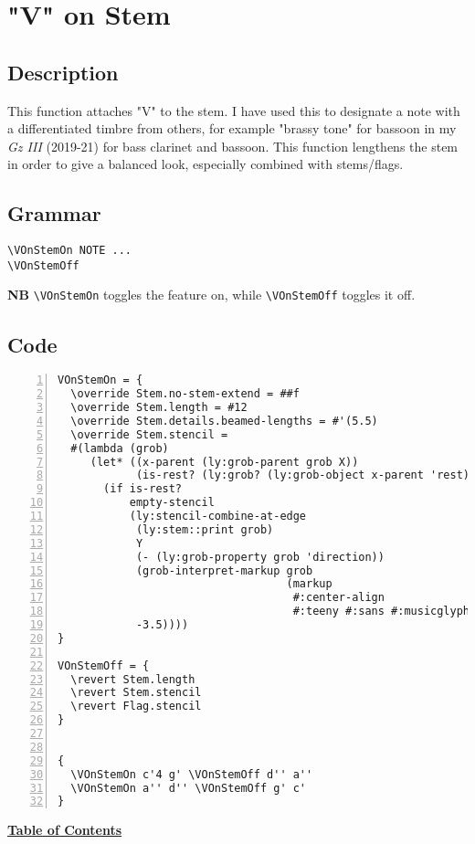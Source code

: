 \vfill \break




\section {"V" on Stem}
\hfill

\subsection{Description}
This function attaches "V" to the stem. I have used this to designate a note with a differentiated timbre from others, for example "brassy tone" for bassoon in my \textit{Gz III} (2019-21) for bass clarinet and bassoon. This function lengthens the stem in order to give a balanced look, especially combined with stems/flags. 
\subsection{Grammar}
\begin{verbatim}
\VOnStemOn NOTE ...
\VOnStemOff
\end{verbatim}
\textbf{NB} \verb|\VOnStemOn| toggles the feature on, while \verb|\VOnStemOff| toggles it off.

\subsection{Code}
\begin{Verbatim}[numbers=left,xleftmargin=5mm]
VOnStemOn = {
  \override Stem.no-stem-extend = ##f
  \override Stem.length = #12
  \override Stem.details.beamed-lengths = #'(5.5)
  \override Stem.stencil =
  #(lambda (grob)
     (let* ((x-parent (ly:grob-parent grob X))
            (is-rest? (ly:grob? (ly:grob-object x-parent 'rest))))
       (if is-rest?
           empty-stencil
           (ly:stencil-combine-at-edge
            (ly:stem::print grob)
            Y
            (- (ly:grob-property grob 'direction))
            (grob-interpret-markup grob
                                   (markup
                                    #:center-align
                                    #:teeny #:sans #:musicglyph "scripts.upbow"))
            -3.5))))
}

VOnStemOff = {
  \revert Stem.length
  \revert Stem.stencil
  \revert Flag.stencil
}


{
  \VOnStemOn c'4 g' \VOnStemOff d'' a''
  \VOnStemOn a'' d'' \VOnStemOff g' c'
}
\end{Verbatim}
\hyperref[sec:toc]{\textbf{Table of Contents}}

\vfill \break


